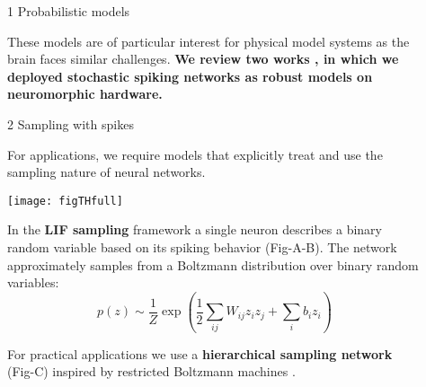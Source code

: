 \begin{frame}
\begin{columns}
\begin{column}{0.99\textwidth}
\begin{columns}[t]
\begin{column}{0.32\textwidth}
\begin{block}{\large 1 Probabilistic models}
\begin{adjustwidth}{1cm}{1cm}
					These models are of particular interest for physical model systems as the brain faces similar challenges.
					\textbf{We review two works \cite{dold2019stochasticity,kungl2019accelerated}, in which we deployed stochastic spiking networks as robust models on neuromorphic hardware.}

					\end{adjustwidth}

					\blockSpaceOne
					\end{block}


					\interBlockSpaceOne



					\begin{block}{\large 2 Sampling with spikes}
					\blockSpaceOne

					\begin{adjustwidth}{1.cm}{1.cm}
					\justifying
					For applications, we require models that explicitly treat and use the sampling nature of neural networks.

					\vspace{.5cm}
					\begin{center}
						\texttt{[image: figTHfull]}
					\end{center}
					\vspace{.5cm}

					In the \textbf{LIF sampling} framework \cite{petrovici2016stochastic} a single neuron describes a binary random variable based on its spiking behavior (Fig-A-B).
					The network approximately samples from a Boltzmann distribution over binary random variables:
					\begin{equation}
					p(z) \sim \frac{1}{Z} \exp \left ( \frac{1}{2} \sum_{ij} W_{ij} z_i z_j + \sum_{i} b_i z_i  \right)
					\end{equation}
					\end{adjustwidth}
					For practical applications we use a \textbf{hierarchical sampling network} (Fig-C) inspired by restricted Boltzmann machines \cite{hinton1984boltzmann}.



					\blockSpaceOne
					\end{block}


				\end{column}

				\begin{column}{.01\textwidth}\end{column}

				\begin{column}{0.32\textwidth}



\end{column}
\end{columns}
\end{column}
\end{columns}
\end{frame}
